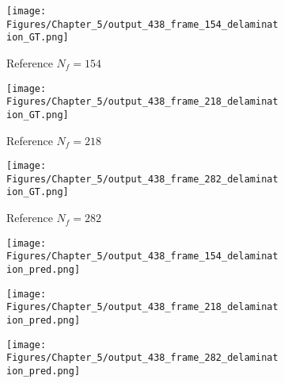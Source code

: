 \begin{figure} [!ht]
	\centering
	\begin{subfigure}[b]{.32\textwidth}
		\centering
		\texttt{[image: Figures/Chapter\_5/output\_438\_frame\_154\_delamination\_GT.png]}
		\caption{Reference $N_f=154$}
		\label{fig:ref_438_damage_154}
	\end{subfigure}
	\hfill
	\begin{subfigure}[b]{.32\textwidth}
		\centering
		\texttt{[image: Figures/Chapter\_5/output\_438\_frame\_218\_delamination\_GT.png]}
		\caption{Reference $N_f=218$}
		\label{fig:ref_438_damage_218}
	\end{subfigure}
	\hfill
	\begin{subfigure}[b]{.32\textwidth}
		\centering
		\texttt{[image: Figures/Chapter\_5/output\_438\_frame\_282\_delamination\_GT.png]}
		\caption{Reference $N_f=282$}
		\label{fig:ref_438_damage_282}	
	\end{subfigure}
	\hfill
	\begin{subfigure}[b]{.32\textwidth}
		\centering
		\texttt{[image: Figures/Chapter\_5/output\_438\_frame\_154\_delamination\_pred.png]}
		\caption{}
		\label{fig:pred_438_damage_154}
	\end{subfigure}
	\hfill
	\begin{subfigure}[b]{.32\textwidth}
		\centering
		\texttt{[image: Figures/Chapter\_5/output\_438\_frame\_218\_delamination\_pred.png]}
		\caption{}
		\label{fig:pred_438_damage_218}
	\end{subfigure}
	\hfill
	\begin{subfigure}[b]{.32\textwidth}
		\centering
		\texttt{[image: Figures/Chapter\_5/output\_438\_frame\_282\_delamination\_pred.png]}
		\caption{}
		\label{fig:pred_438_damage_282}	
	\end{subfigure}
	\caption{}
	\label{fig:num_results_CS_damage_area_438}
\end{figure}


